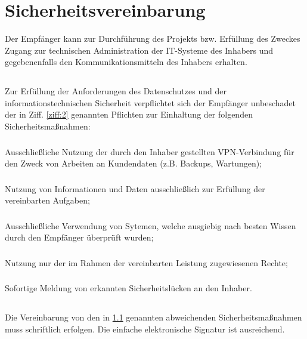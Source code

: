 \documentclass[10pt]{article}
\begin{document}
\section{Sicherheitsvereinbarung}
Der Empfänger kann zur Durchführung des Projekts bzw. Erfüllung des Zweckes Zugang zur technischen Administration der IT-Systeme des Inhabers und gegebenenfalls den Kommunikationsmitteln des Inhabers erhalten. 

\subsection{} \label{ziff:3.1} Zur Erfüllung der Anforderungen des Datenschutzes und der informationstechnischen Sicherheit verpflichtet sich der Empfänger unbeschadet der in Ziff. \ref{ziff:2} genannten Pflichten zur Einhaltung der folgenden Sicherheitsmaßnahmen:

\subsubsection{} Ausschließliche Nutzung der durch den Inhaber gestellten VPN-Verbindung für den Zweck von Arbeiten an Kundendaten (z.B. Backups, Wartungen);

\subsubsection{} Nutzung von Informationen und Daten ausschließlich zur Erfüllung der vereinbarten Aufgaben; 

\subsubsection{} Ausschließliche Verwendung von Sytemen, welche ausgiebig nach besten Wissen durch den Empfänger überprüft wurden;

\subsubsection{} Nutzung nur der im Rahmen der vereinbarten Leistung zugewiesenen Rechte; 

\subsubsection{} Sofortige Meldung von erkannten Sicherheitslücken an den Inhaber. 

\subsection{} Die Vereinbarung von den in \ref{ziff:3.1} genannten abweichenden Sicherheitsmaßnahmen muss schriftlich erfolgen. Die einfache elektronische Signatur ist ausreichend. 
\end{document}

